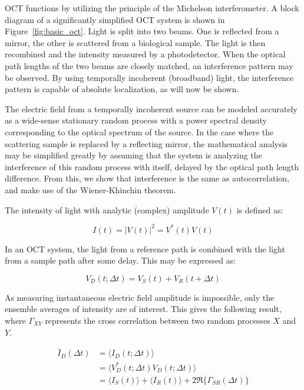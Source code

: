OCT functions by utilizing the principle of the Michelson interferometer. A block diagram of a significantly simplified OCT system is shown in Figure~\ref{fig:basic_oct}. Light is split into two beams. One is reflected from a mirror, the other is scattered from a biological sample. The light is then recombined and the intensity measured by a photodetector. When the optical path lengths of the two beams are closely matched, an interference pattern may be observed. By using temporally incoherent (broadband) light, the interference pattern is capable of absolute localization, as will now be shown.

The electric field from a temporally incoherent source can be modeled accurately as a wide-sense stationary random process with a power spectral density corresponding to the optical spectrum of the source. \cite{bouma} In the case where the scattering sample is replaced by a reflecting mirror, the mathematical analysis may be simplified greatly by assuming that the system is analyzing the interference of this random process with itself, delayed by the optical path length difference. From this, we show that interference is the same as autocorrelation, and make use of the Wiener-Khinchin theorem. \cite{fercher}

The intensity of light with analytic (complex) amplitude $V(t)$ is defined as:

\begin{equation}
I(t) = |V(t)|^2 = V^*(t)V(t)
\end{equation}

In an OCT system, the light from a reference path is combined with the light from a sample path after some delay. This may be expressed as:

\begin{equation}
V_D(t; \Delta t) = V_S(t) + V_R(t + \Delta t)
\end{equation}

As measuring instantaneous electric field amplitude is impossible, only the ensemble averages of intensity are of interest. This gives the following result, where $\Gamma_{XY}$ represents the cross correlation between two random processes $X$ and $Y$.

\begin{equation}
\begin{aligned}
\bar{I}_D(\Delta t) & =  \langle I_D(t; \Delta t) \rangle \\
& =  \langle V^*_D(t; \Delta t) V_D(t; \Delta t) \rangle \\
& =  \langle I_S(t) \rangle + \langle I_R(t) \rangle + 2 \Re \{\Gamma_{SR} (\Delta t) \}
\end{aligned}
\end{equation}

